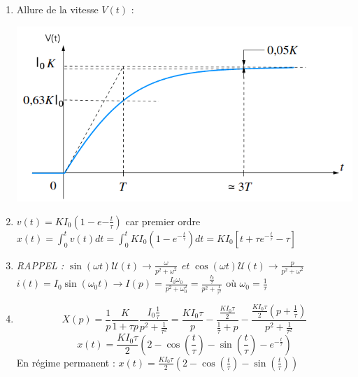 {\begin{enumerate}
\[ \lim_{p \rightarrow +\infty} v(t)=\lim_{p \rightarrow 0} pV(p) = \lim_{p \rightarrow 0} p^2X(p)=\lim_{p \rightarrow 0} pH(p)I_0=\lim_{p \rightarrow 0} \frac{KI_O}{1+\tau p}=KI_0 \]
\item Allure de la vitesse $V(t)$ :
\begin{center}
\includegraphics[scale=0.5]{png/courbe-prob1-cor.png}
\end{center}
\item \( v(t)=KI_0(1-e{-\frac{t}{\tau}}) \) car premier ordre\\
\( x(t)=\int_0^t v(t)dt=\int_0^t KI_0(1-e^{-\frac{t}{\tau}})dt=KI_0[t+\tau e^{-\frac{t}{\tau}}-\tau] \)
\item \textit{RAPPEL : $\sin(\omega t)\mathcal{U}(t) \rightarrow \frac{\omega}{p^2+\omega^2}$ et $\cos(\omega t)\mathcal{U}(t) \rightarrow \frac{p}{p^2+\omega^2}$}\\
\( i(t)=I_0\sin(\omega_0 t) \rightarrow I(p)=\frac{I_0\omega_0}{p^2+\omega_0^2}=\frac{\frac{I_0}{\tau}}{p^2+\frac{1}{\tau^2}} \) où $\omega_0=\frac{1}{\tau}$
\item \[ X(p)=\frac{1}{p}\frac{K}{1+\tau p}\frac{I_0\frac{1}{\tau}}{p^2+\frac{1}{\tau^2}}=\frac{KI_0 \tau}{p}-\frac{\frac{KI_0 \tau}{2}}{\frac{1}{\tau}+p}-\frac{\frac{KI_0 \tau}{2}(p+\frac{1}{\tau})}{p^2+\frac{1}{\tau^2}} \]
\[ x(t)=\frac{KI_0 \tau}{2}(2-\cos(\frac{t}{\tau})-\sin(\frac{t}{\tau})-e^{-\frac{t}{\tau}}) \]
En régime permanent : \( x(t)=\frac{KI_0 \tau}{2}(2-\cos(\frac{t}{\tau})-\sin(\frac{t}{\tau})) \)
\end{enumerate}
}
\newpage



